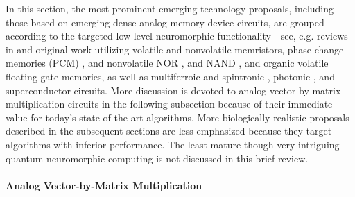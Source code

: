 In this section, the most prominent emerging technology proposals, including those based on emerging dense analog memory device circuits, are grouped according to the targeted low-level neuromorphic functionality - see, e.g. reviews in \cite{Burr2017, Bavandpour2018, Yang2013NatureNano, Yu2018IEEE} and original work utilizing volatile \cite{Sheridan2017, Cai2019NatElec, Chu2014Neuro, Yeon2020, Ohno2011, Wang2017NatMat, Pickett2013, Wang2018NatElec, Zhang2018Small, Lashkare2018, Adda2018} and nonvolatile \cite{Alibart2012, Adam2017,Govoreanu2013, Prezioso2015, Prezioso2016, Prezioso2018, MerrikhBayat2018, Lin2020NatElec, Hu2018AdvMat, Yao2020Nature, Liu2020ISSCC, Kim2019XBAR, Cai2020NatElec, Mahmoodi2019IEDM, Mahmoodi2019NatComm, Li2016IEDM, Wang2018NatElec, Pedretti2017}  memristors, phase change memories (PCM) \cite{Burr2015, Tuma2016, Ambrogio2018, Karunaratne2020, Joshi2020, Kuzum2011, Rios2019}, and nonvolatile NOR \cite{Guo2017CICC, Guo2017IEDM, MerrikhBayat2015, Mahmoodi2019NatComm}, and NAND \cite{Bavandpour2019NAND, Bavandpour2020, Lee2019NAND}, and organic volatile \cite{Fuller2019} floating gate memories, as well as multiferroic and spintronic \cite{Grollier2020, Ostwal2018, Sengupta2016, Romera2018, Ni2018IEDM}, photonic \cite{Shasti2021, Goi2020, Rios2019, Lin2019Sciece, Hamerly2019PhysRevX, Hamley2019, Shen2017NatPhot, Tait2016, Feldmann2019, Buckley2017, Bruiner2013, Vandoorne2014}, and superconductor \cite{Segall2017, Buckley2017, Rowlands2021} circuits. More discussion is devoted to analog vector-by-matrix multiplication circuits in the following subsection because of their immediate value for today's state-of-the-art algorithms. More biologically-realistic proposals described in the subsequent sections are less emphasized because they target algorithms with inferior performance. The least mature though very intriguing quantum neuromorphic computing \cite{Yamamoto2020, Markovich2020} is not discussed in this brief review.
    

\paragraph*{Analog Vector-by-Matrix Multiplication}

